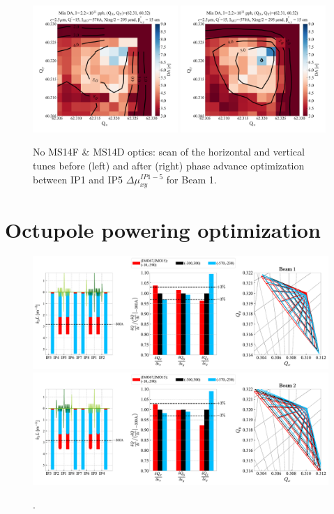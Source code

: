 \documentclass{cernatsnote}
\begin{document}
\begin{figure}[h!]
\centering
\includegraphics[width=0.49\textwidth]{images/q_vs_da_noms14fms14d_muxy_0.png} \hfill \includegraphics[width=0.49\textwidth]{images/q_vs_da_noms14fms14d_muxy_optim.png} \\
\caption{\label{da_scan_ms14fms14d} No MS14F \& MS14D optics: scan of the horizontal and vertical tunes before (left) and after (right) phase advance optimization between IP1 and IP5 $\Delta\mu_{xy}^{IP1-5}$ for Beam 1.}
\end{figure}



\section{Octupole powering optimization}

\begin{figure}[h!]
\centering
\includegraphics[width=1\textwidth]{images/twiss_ampdet_b1_vsoctfamily.pdf}
\includegraphics[width=1\textwidth]{images/twiss_ampdet_b2_vsoctfamily.pdf}
\caption{\label{fig_twiss_octfamily} .}
\end{figure}
\end{document}
